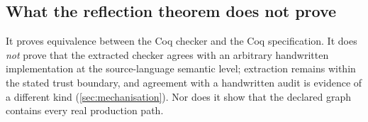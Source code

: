 \subsection{What the reflection theorem does not prove}
It proves equivalence between the Coq checker and the Coq specification. It does \emph{not} prove that the extracted checker agrees with an arbitrary handwritten implementation at the source-language semantic level; extraction remains within the stated trust boundary, and agreement with a handwritten audit is evidence of a different kind (\cref{sec:mechanisation}). Nor does it show that the declared graph contains every real production path.
